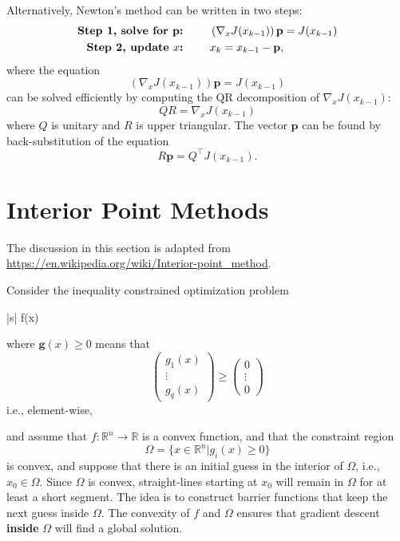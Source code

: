 \documentclass{article}
\newcommand{\gbf}{\mathbf{g}}
\begin{document}
Alternatively, Newton's method can be written in two steps:
\begin{align*}
\text{\bf Step 1,~solve for $\mathbf{p}$:~} &\qquad	\left(\nabla_x J(x_{k-1})\right) \mathbf{p} = J(x_{k-1}) \\
\text{\bf Step 2, update $x$:~} &\qquad x_k = x_{k-1} - \mathbf{p},
\end{align*}
where the equation
\[
\left(\nabla_x J(x_{k-1})\right) \mathbf{p} = J(x_{k-1})
\]
can be solved efficiently by computing the QR decomposition of $\nabla_x J(x_{k-1})$:
\[
QR = \nabla_x J(x_{k-1})
\]
where $Q$ is unitary and $R$ is upper triangular.  The vector $\mathbf{p}$ can be found by back-substitution of the equation
\[
R\mathbf{p} = Q^\top J(x_{k-1}).
\]


\section{Interior Point Methods}

The discussion in this section is adapted from \url{https://en.wikipedia.org/wiki/Interior-point\_method}.

Consider the inequality constrained optimization problem
			\begin{mini*}|s|
				{}{f(x)}{}{}
				\addConstraint{\gbf(x) \geq 0}
			\end{mini*}
			where $\gbf(x) \geq 0$ means that
			\[
				\begin{pmatrix}
			    	g_1(x)\\
			    	\vdots\\
			    	g_q(x)
			  	\end{pmatrix} 
			  	\geq \begin{pmatrix} 
		 				0 \\ \vdots \\ 0
					 \end{pmatrix}
			\]
			i.e., element-wise,
			 
	and assume that $f:\mathbb{R}^n\to\mathbb{R}$ is a convex function, and that the constraint region
	\[
		\Omega = \{x\in\mathbb{R}^n | g_i(x) \geq 0\}
	\]
	is convex, and suppose that there is an initial guess in the interior of $\Omega$, i.e., $x_0\in\Omega$. Since $\Omega$ is convex, straight-lines starting at $x_0$ will remain in $\Omega$ for at least a short segment.  The idea is to construct barrier functions that keep the next guess inside $\Omega$.  The convexity of $f$ and $\Omega$ ensures that gradient descent {\bf inside} $\Omega$ will find a global solution.
	
\end{document}
